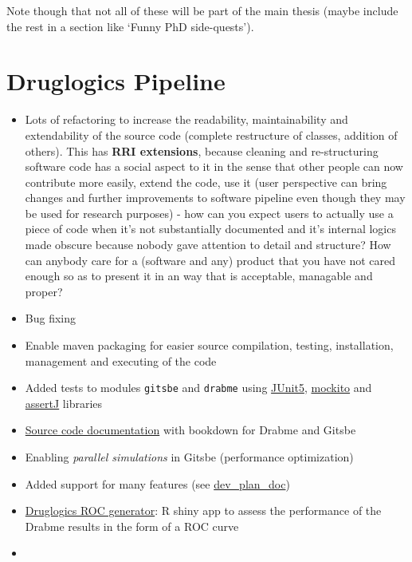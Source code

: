 \documentclass[
  12pt,
]{book}
\providecommand{\tightlist}{%
  \setlength{\itemsep}{0pt}\setlength{\parskip}{0pt}}
\begin{document}
Note though that not all of these will be part of the main thesis (maybe include the
rest in a section like `Funny PhD side-quests').

\hypertarget{druglogics-pipeline}{%
\section*{Druglogics Pipeline}\label{druglogics-pipeline}}

\begin{itemize}
\tightlist
\item
  Lots of refactoring to increase the readability, maintainability and
  extendability of the source code (complete restructure of classes, addition of
  others).
  This has \textbf{RRI extensions}, because cleaning and re-structuring software code has a social aspect to it in the sense that other people can now contribute more easily, extend the code, use it (user perspective can bring changes and further improvements to software pipeline even though they may be used for research purposes) - how can you expect users to actually use a piece of code when it's not substantially documented and it's internal logics made obscure because nobody gave attention to detail and structure? How can anybody care for a (software and any) product that you have not cared enough so as to present it in an way that is acceptable, managable and proper?
\item
  Bug fixing
\item
  Enable maven packaging for easier source compilation, testing,
  installation, management and executing of the code
\item
  Added tests to modules \texttt{gitsbe} and \texttt{drabme} using \href{https://junit.org/junit5/}{JUnit5}, \href{https://site.mockito.org/}{mockito} and \href{https://assertj.github.io/doc/}{assertJ} libraries
\item
  \href{https://druglogics.github.io/druglogics-doc/}{Source code documentation} with bookdown for Drabme and Gitsbe
\item
  Enabling \emph{parallel simulations} in Gitsbe (performance optimization)
\item
  Added support for many features (see \href{http://tiny.cc/DLDevPlan}{dev\_plan\_doc})
\item
  \href{https://github.com/bblodfon/druglogics-roc}{Druglogics ROC generator}:
  R shiny app to assess the performance of the Drabme results in the form of a
  ROC curve
\item

\end{itemize}
\end{document}
